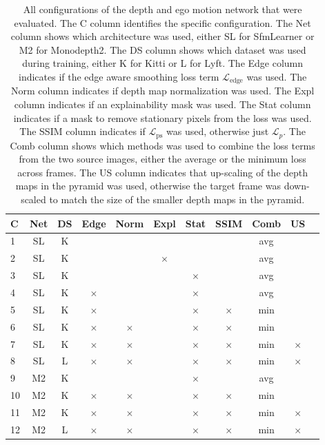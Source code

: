 \begin{table}[H]
\centering
\begin{tabular}{|l|c|c||c|c||c|c||c|c|c|c|}
\hline
C & Net & DS & Edge & Norm & Expl & Stat & SSIM & Comb & US \\
\hline
1 & SL & K &  &  &  &  &  & avg &  \\
\hline
2 & SL & K &  &  & $ \times $ &  &  & avg &  \\
\hline
3 & SL & K &  &  &  & $ \times $ &  & avg &  \\
\hline
4 & SL & K & $ \times $ &  &  & $ \times $ &  & avg &  \\
\hline
5 & SL & K & $ \times $ &  &  & $ \times $ & $ \times $ & min &  \\
\hline
6 & SL & K & $ \times $ & $ \times $ &  & $ \times $ & $ \times $ & min &  \\
\hline
7 & SL & K & $ \times $ & $ \times $ &  & $ \times $ & $ \times $ & min & $ \times $ \\
\hline
8 & SL & L & $ \times $ & $ \times $ &  & $ \times $ & $ \times $ & min & $ \times $ \\
\hline
9 & M2 & K &  &  &  & $ \times $ &  & avg &  \\
\hline
10 & M2 & K & $ \times $ & $ \times $ &  & $ \times $ & $ \times $ & min &  \\
\hline
11 & M2 & K & $ \times $ & $ \times $ &  & $ \times $ & $ \times $ & min & $ \times $ \\
\hline
12 & M2 & L & $ \times $ & $ \times $ &  & $ \times $ & $ \times $ & min & $ \times $ \\
\hline
\end{tabular}
\caption{All configurations of the depth and ego motion network that were evaluated. The C column identifies the specific configuration. The Net column shows which architecture was used, either SL for SfmLearner or M2 for Monodepth2. The DS column shows which dataset was used during training, either K for Kitti or L for Lyft. The Edge column indicates if the edge aware smoothing loss term $\mathcal{L}_{\mathrm{edge}}$ was used. The Norm column indicates if depth map normalization was used. The Expl column indicates if an explainability mask was used. The Stat column indicates if a mask to remove stationary pixels from the loss was used. The SSIM column indicates if $\mathcal{L}_{\mathrm{ps}}$ was used, otherwise just $\mathcal{L}_{p}$. The Comb column shows which methods was used to combine the loss terms from the two source images, either the average or the minimum loss across frames. The US column indicates that up-scaling of the depth maps in the pyramid was used, otherwise the target frame was down-scaled to match the size of the smaller depth maps in the pyramid.}
\label{table:configurations}
\end{table}


